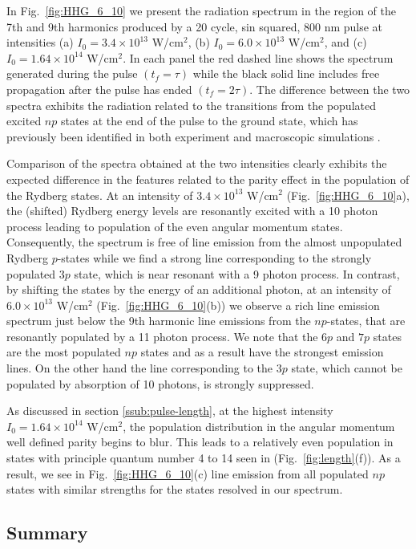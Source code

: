 In Fig.~\ref{fig:HHG_6_10} we present the radiation spectrum in the region of the 7th and 9th harmonics produced by a 20 cycle, sin squared, 800 nm pulse at intensities (a) $I_0 = 3.4\times10^{13}$ W/cm$^2$, (b) $I_0 = 6.0\times10^{13}$ W/cm$^2$, and (c) $I_0 = 1.64\times10^{14}$ W/cm$^2$. In each panel the red dashed line shows the spectrum generated during the pulse $(t_f = \tau)$ while the black solid line includes free propagation after the pulse has ended $(t_f = 2\tau)$. The difference between the two spectra exhibits the radiation related to the transitions from the populated excited $np$ states at the end of the pulse to the ground state, which has previously been identified in both experiment \cite{chini2014} and macroscopic simulations \cite{camp2015,beaulieu2016}.

Comparison of the spectra obtained at the two intensities clearly exhibits the expected difference in the features related to the parity effect in the population of the Rydberg states. At an intensity of $3.4\times10^{13}$ W/cm$^2$ (Fig.~\ref{fig:HHG_6_10}a), the (shifted) Rydberg energy levels are resonantly excited with a 10 photon process leading to population of the even angular momentum states. Consequently, the spectrum is free of line emission from the almost unpopulated Rydberg $p$-states while we find a strong line corresponding to the strongly populated $3p$ state, which is near resonant with a 9 photon process. In contrast, by shifting the states by the energy of an additional photon, at an intensity of $6.0\times10^{13}$ W/cm$^2$ (Fig.~\ref{fig:HHG_6_10}(b)) we observe a rich line emission spectrum just below the 9th harmonic line emissions from the $np$-states, that are resonantly populated by a 11 photon process. We note that the $6p$ and $7p$ states are the most populated $np$ states and as a result have the strongest emission lines. On the other hand the line corresponding to the $3p$ state, which cannot be populated by absorption of 10 photons, is strongly suppressed.

As discussed in section \ref{ssub:pulse-length}, at the highest intensity $I_0=1.64\times10^{14}$ W/cm$^2$, the population distribution in the angular momentum well defined parity begins to blur. This leads to a relatively even population in states with principle quantum number 4 to 14 seen in (Fig.~\ref{fig:length}(f)). As a result, we see in Fig.~\ref{fig:HHG_6_10}(c) line emission from all populated $np$ states with similar strengths for the states resolved in our spectrum.

\subsection{Summary}
\label{sub:summary}

